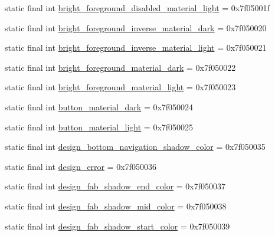 \begin{DoxyCompactItemize}
static final int \mbox{\hyperlink{classandroid_1_1support_1_1design_1_1_r_1_1color_a776883b09016b4f837ed279284e8f16a}{bright\+\_\+foreground\+\_\+disabled\+\_\+material\+\_\+light}} = 0x7f05001f
\item 
static final int \mbox{\hyperlink{classandroid_1_1support_1_1design_1_1_r_1_1color_a0f8c2acced8fd37241fd488cfb6a4397}{bright\+\_\+foreground\+\_\+inverse\+\_\+material\+\_\+dark}} = 0x7f050020
\item 
static final int \mbox{\hyperlink{classandroid_1_1support_1_1design_1_1_r_1_1color_ab90e3df7107fcc71538465a8a2f95bd8}{bright\+\_\+foreground\+\_\+inverse\+\_\+material\+\_\+light}} = 0x7f050021
\item 
static final int \mbox{\hyperlink{classandroid_1_1support_1_1design_1_1_r_1_1color_af7145fbb518203f5aa6ee291adca6389}{bright\+\_\+foreground\+\_\+material\+\_\+dark}} = 0x7f050022
\item 
static final int \mbox{\hyperlink{classandroid_1_1support_1_1design_1_1_r_1_1color_ae39a16e83ec527288841137b165c2d3c}{bright\+\_\+foreground\+\_\+material\+\_\+light}} = 0x7f050023
\item 
static final int \mbox{\hyperlink{classandroid_1_1support_1_1design_1_1_r_1_1color_a38c6561c22dceef627a0c105ca5b3273}{button\+\_\+material\+\_\+dark}} = 0x7f050024
\item 
static final int \mbox{\hyperlink{classandroid_1_1support_1_1design_1_1_r_1_1color_ae5e7a4df8be00d0ffa75ddc098ff753c}{button\+\_\+material\+\_\+light}} = 0x7f050025
\item 
static final int \mbox{\hyperlink{classandroid_1_1support_1_1design_1_1_r_1_1color_a1d8e47550e60233115241f5597fc54ea}{design\+\_\+bottom\+\_\+navigation\+\_\+shadow\+\_\+color}} = 0x7f050035
\item 
static final int \mbox{\hyperlink{classandroid_1_1support_1_1design_1_1_r_1_1color_aae58418ebb70a39b6e4b07b7dc0fbd5a}{design\+\_\+error}} = 0x7f050036
\item 
static final int \mbox{\hyperlink{classandroid_1_1support_1_1design_1_1_r_1_1color_a9ba19019371146377edd57f3fc7b3184}{design\+\_\+fab\+\_\+shadow\+\_\+end\+\_\+color}} = 0x7f050037
\item 
static final int \mbox{\hyperlink{classandroid_1_1support_1_1design_1_1_r_1_1color_a80ff80abb78cf8c58d69390b7ae713eb}{design\+\_\+fab\+\_\+shadow\+\_\+mid\+\_\+color}} = 0x7f050038
\item 
static final int \mbox{\hyperlink{classandroid_1_1support_1_1design_1_1_r_1_1color_ad75b8a513073855f5c7122eb4decf918}{design\+\_\+fab\+\_\+shadow\+\_\+start\+\_\+color}} = 0x7f050039

\end{DoxyCompactItemize}
